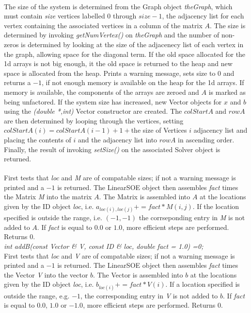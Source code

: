  \\ 
The size of the system is determined from the Graph object {\em
theGraph}, which must contain {\em size} vertices labelled $0$ through
$size-1$, the adjacency list for each vertex containing the associated
vertices in a column of the matrix $A$. The size is determined by
invoking {\em getNumVertex()} on {\em theGraph} and the number of
non-zeros is determined by looking at the size of the adjacenecy list
of each vertex in the graph, allowing space for the diagonal term. If
the old space allocated for the 1d arrays is not big enough, it the
old space is returned to the heap and new space is allocated from the
heap. Prints a warning message, sets size to $0$ and returns a $-1$,
if not enough memory is available on the heap for the 1d arrays. If
memory is available, the components of the arrays are 
zeroed and $A$ is marked as being unfactored. If the system size has
increased, new Vector objects for $x$ and $b$ using the {\em (double
*,int)} Vector constructor are created. The $colStartA$ and $rowA$ are
then determined by looping through the vertices, setting $colStartA(i)
= colStartA(i-1) + 1 + $the size of Vertices $i$ adjacency list and 
placing the contents of $i$ and the adjacency list into $rowA$ in
ascending order. Finally, the result of invoking {\em setSize()} on
the associated Solver object is returned. \\ 


 \\
First tests that {\em loc} and {\em M} are of compatable sizes; if not
a warning message is printed and a $-1$ is returned. The LinearSOE
object then assembles {\em fact} times the Matrix {\em 
M} into the matrix $A$. The Matrix is assembled into $A$ at the
locations given by the ID object {\em loc}, i.e. $a_{loc(i),loc(j)} +=
fact * M(i,j)$. If the location specified is outside the range,
i.e. $(-1,-1)$ the corrseponding entry in {\em M} is not added to
$A$. If {\em fact} is equal to $0.0$ or $1.0$, more efficient steps
are performed. Returns $0$.  \\


{\em int addB(const Vector \& V, const ID \& loc,
double fact = 1.0) =0;} \\
First tests that {\em loc} and {\em V} are of compatable sizes; if not
a warning message is printed and a $-1$ is returned. The LinearSOE
object then assembles {\em fact} times the Vector {\em V} into
the vector $b$. The Vector is assembled into $b$ at the locations
given by the ID object {\em loc}, i.e. $b_{loc(i)} += fact * V(i)$. If a
location specified is outside the range, e.g. $-1$, the corresponding
entry in {\em V} is not added to $b$. If {\em fact} is equal to $0.0$,
$1.0$ or $-1.0$, more efficient steps are performed. Returns $0$. \\


